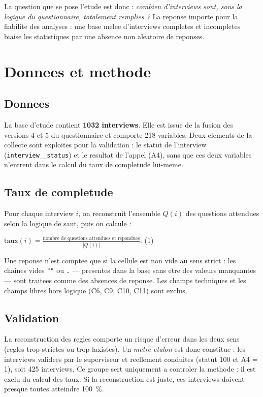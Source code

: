 \documentclass[11pt,a4paper]{article}
\begin{document}
La question que se pose l'etude est donc : \emph{combien d'interviews sont,
sous la logique du questionnaire, totalement remplies ?} La reponse importe
pour la fiabilite des analyses : une base melee d'interviews completes et
incompletes biaise les statistiques par une absence non aleatoire de
reponses.

\section{Donnees et methode}

\subsection{Donnees}

La base d'etude contient \textbf{1032 interviews}. Elle est issue de la
fusion des versions 4 et 5 du questionnaire et comporte 218 variables.
Deux elements de la collecte sont exploites pour la validation : le statut
de l'interview (\texttt{interview\_\_status}) et le resultat de l'appel
(A4), sans que ces deux variables n'entrent dans le calcul du taux de
completude lui-meme.

\subsection{Taux de completude}

Pour chaque interview $i$, on reconstruit l'ensemble $Q(i)$ des questions
attendues selon la logique de saut, puis on calcule :
%
\begin{center}
  $\displaystyle \text{taux}(i)=\frac{\text{nombre de questions attendues et
  repondues}}{|Q(i)|}$. \qquad (1)
\end{center}

Une reponse n'est comptee que si la cellule est non vide au sens strict :
les chaines vides \texttt{""} ou \texttt{.} --- presentes dans la base sans
etre des valeurs manquantes --- sont traitees comme des absences de
reponse. Les champs techniques et les champs libres hors logique (C6, C9,
C10, C11) sont exclus.

\subsection{Validation}

La reconstruction des regles comporte un risque d'erreur dans les deux
sens (regles trop strictes ou trop laxistes). Un \emph{metre etalon} est
donc constitue : les interviews validees par le superviseur et reellement
conduites (statut 100 et A4 = 1), soit 425 interviews. Ce groupe sert
uniquement a controler la methode : il est exclu du calcul des taux.
Si la reconstruction est juste, ces interviews doivent presque toutes
atteindre 100~\%.
\end{document}
